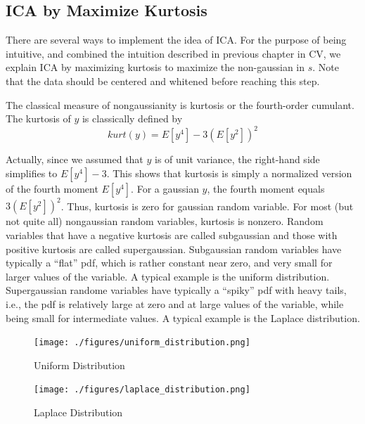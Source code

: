 \documentclass[a4paper]{book}
\begin{document}
    \subsection{ICA by Maximize Kurtosis}

    There are several ways to implement the idea of ICA. For the purpose
    of being intuitive, and combined the intuition described in previous
    chapter in CV, we explain ICA by maximizing kurtosis to maximize the
    non-gaussian in $s$\cite{Hyvarinen:2000:ICA:351654.351659}. Note
    that the data should be centered and whitened before reaching this
    step.

    The classical measure of nongaussianity is kurtosis or the
    fourth-order cumulant. The kurtosis of $y$ is classically defined by
    \begin{displaymath}
      kurt(y) = E[y^{4}] - 3(E[y^{2}])^{2}
    \end{displaymath}

    Actually, since we assumed that $y$ is of unit variance, the
    right-hand side simplifies to $E[y^{4}] - 3$. This shows that
    kurtosis is simply a normalized version of the fourth moment
    $E[y^{4}]$. For a gaussian $y$, the fourth moment equals
    $3(E[y^{2}])^{2}$. Thus, kurtosis is zero for gaussian random
    variable. For most (but not quite all) nongaussian random variables,
    kurtosis is nonzero. Random variables that have a negative kurtosis
    are called subgaussian and those with positive kurtosis are called
    supergaussian. Subgaussian random variables have typically a
    ``flat'' pdf, which is rather constant near zero, and very small for
    larger values of the variable. A typical example is the uniform
    distribution. Supergaussian randome variables have typically a
    ``spiky'' pdf with heavy tails, i.e., the pdf is relatively large at
    zero and at large values of the variable, while being small for
    intermediate values. A typical example is the Laplace distribution.

    \begin{figure}
      \texttt{[image: ./figures/uniform\_distribution.png]}
      \caption{Uniform Distribution\label{fig:uniform_distribution}}

      \endminipage
      \texttt{[image: ./figures/laplace\_distribution.png]}
      \caption{Laplace Distribution\label{fig:laplace_distribution}}

      \endminipage\hfill
    \end{figure}
\end{document}
